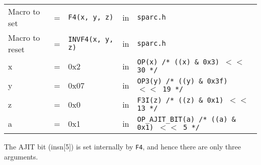 \begin{enumerate}
  \begin{tabular}[h]{lclcl}
    Macro to set  &=& \texttt{F4(x, y, z)} &in& \texttt{sparc.h}     \\
    Macro to reset  &=& \texttt{INVF4(x, y, z)} &in& \texttt{sparc.h}     \\
    x &=& 0x2      &in& \texttt{OP(x)  /* ((x) \& 0x3)  $<<$ 30 */} \\
    y &=& 0x07     &in& \texttt{OP3(y) /* ((y) \& 0x3f) $<<$ 19 */} \\
    z &=& 0x0      &in& \texttt{F3I(z) /* ((z) \& 0x1)  $<<$ 13 */} \\
    a &=& 0x1      &in& \texttt{OP\_AJIT\_BIT(a) /* ((a) \& 0x1)  $<<$ 5 */}
  \end{tabular}

  The AJIT bit  (insn[5]) is set internally by  \texttt{F4}, and hence
  there are only three arguments.
  

\end{enumerate}
